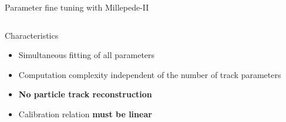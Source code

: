 \documentclass{ikpKoeln}
\begin{document}
\begin{frame}[t]{Parameter fine tuning with Millepede-II}
	\vspace{-2em}
	\begin{columns}[t]
		\begin{column}{0.45 \textwidth}
			\begin{exampleblock} {Characteristics}
				\begin{itemize}
					\item Simultaneous fitting of all parameters
					\item Computation complexity independent of the number of track parameters
					\item \alert{\textbf{No particle track reconstruction}}
					\item Calibration relation \textbf{must be linear}
				\end{itemize}
			\end{exampleblock}


\end{column}
\end{columns}
\end{frame}
\end{document}
